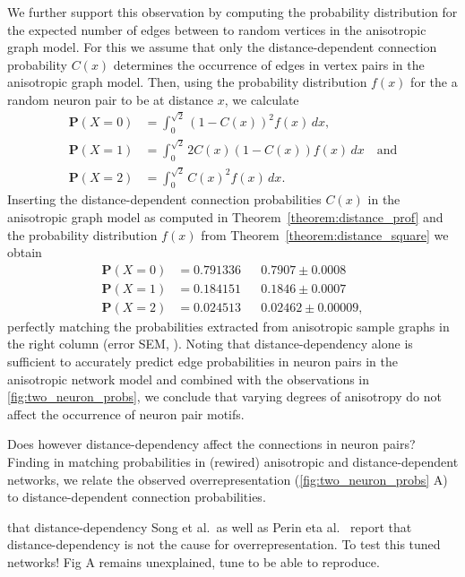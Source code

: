 We further support this observation by computing the probability
distribution for the expected number of edges between to random
vertices in the anisotropic graph model. For this we assume that only
the distance-dependent connection probability $C(x)$ determines the
occurrence of edges in vertex pairs in the anisotropic graph
model. Then, using the probability distribution $f(x)$ for the a
random neuron pair to be at distance $x$, we calculate
\begin{align*}
\mathbf{P}(X=0) & = \int_0^{\sqrt{2}} (1-C(x))^2 f(x)\,
dx, \\
\mathbf{P}(X=1) & = \int_0^{\sqrt{2}} 2 C(x) (1-C(x)) f(x) \, dx \quad \mathrm{and}\\
\mathbf{P}(X=2) & = \int_0^{\sqrt{2}} C(x)^2 f(x) \, dx. 
\end{align*}
Inserting the distance-dependent connection probabilities $C(x)$ in
the anisotropic graph model as computed in
Theorem~\ref{theorem:distance_prof} and the probability distribution
$f(x)$ from Theorem~\ref{theorem:distance_square} we obtain
\begin{align*} 
\mathbf{P}(X=0) & = 0.791336 && 0.7907  \pm 0.0008\\
\mathbf{P}(X=1) & = 0.184151 && 0.1846  \pm 0.0007\\
\mathbf{P}(X=2) & = 0.024513 && 0.02462  \pm 0.00009,
\end{align*}
perfectly matching the probabilities extracted from anisotropic sample
graphs in the right column (error SEM, ). Noting
that distance-dependency alone is sufficient to accurately predict
edge probabilities in neuron pairs in the anisotropic network model
and combined with the observations in \autoref{fig:two_neuron_probs},
we conclude that varying degrees of anisotropy do not affect the
occurrence of neuron pair motifs.





Does however distance-dependency affect the connections in neuron
pairs? Finding in matching probabilities in (rewired) anisotropic and
distance-dependent networks, we relate the observed overrepresentation
(\autoref{fig:two_neuron_probs} A) to distance-dependent connection
probabilities. 

 that distance-dependency Song
et al.~as well as Perin eta al.~ report that distance-dependency is
not the cause for overrepresentation. To test this tuned networks! Fig
A remains unexplained, tune to be able to reproduce.



